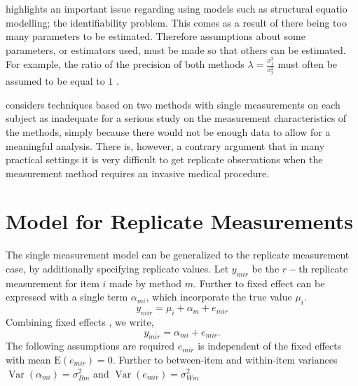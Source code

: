 \documentclass[12pt, a4paper]{report}
\theoremstyle{plain}
\theoremstyle{definition}
\theoremstyle{remark}
\begin{document}
\citet{DunnSEME} highlights an important issue regarding using
models such as structural equatio modelling; the identifiability problem. This comes as a result of there being too many parameters to be estimated.
Therefore assumptions about some parameters, or estimators used,
must be made so that others can be estimated. For example, the ratio of the precision of both methods $\lambda=\frac{\sigma^{2}_{1}}{\sigma^{2}_{2}}$
must often be assumed to be equal to $1$ \citep{linnet98}. 

\citet{DunnSEME} considers techniques based on two methods with single measurements on each subject as inadequate for a serious study on the measurement characteristics of the methods, simply because there would not be enough data to allow for a meaningful analysis. There is, however, a contrary argument that in many practical settings it is very difficult to get replicate
observations when the measurement method requires an invasive medical
procedure.


\section{Model for Replicate Measurements}

The single measurement model can be generalized to the replicate measurement case, by additionally specifying replicate values. Let $y_{mir}$ be the $r-$th replicate measurement for item $i$ made by method $m$. Further to \citet{Barnhart} fixed effect can be expressed with a single term $\alpha_{mi}$, which incorporate the true value $\mu_i$.
\[ y_{mir} = \mu_{i} + \alpha_{m} + e_{mir}  \]
Combining fixed effects \citep{Barnhart}, we write,
\[ y_{mir} = \alpha_{mi} + e_{mir}.\]
The following assumptions are required
$e_{mir}$ is independent of the fixed effects with mean $\mbox{E}(e_{mir}) = 0$.
Further to \citet{Barnhart} between-item and within-item variances $\operatorname{Var}(\alpha_{mi}) = \sigma^2_{Bm}$ and $\operatorname{Var}(e_{mir}) = \sigma^2_{Wm}$		
\end{document}
